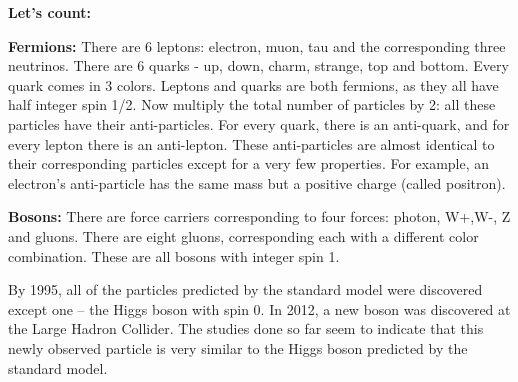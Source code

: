 {\bf Let’s count:} 

{\bf Fermions:} There are 6 leptons: electron, muon, tau and the corresponding three neutrinos.
There are 6 quarks - up, down, charm, strange, top and bottom. Every quark comes in 3 colors.
Leptons and quarks are both fermions, as they all have half integer spin 1/2.
Now multiply the total number of particles by 2: all these particles have their anti-particles. For every quark, there is an anti-quark, and for every lepton there is an anti-lepton. These anti-particles are almost identical to their corresponding particles except for a very few properties.  For example, an electron's anti-particle has the same mass but a positive charge (called positron).

{\bf Bosons:} There are force carriers corresponding to four forces: photon, W+,W-,  Z and gluons.  There are eight gluons, corresponding each with a different color combination.  These are all bosons with integer spin 1.

By 1995, all of the particles predicted by the standard model were discovered except one – the Higgs boson with spin 0. In 2012, a new boson was discovered at the Large Hadron Collider.  The studies done so far seem to indicate that this newly observed particle is very similar to the Higgs boson predicted by the standard model. 

